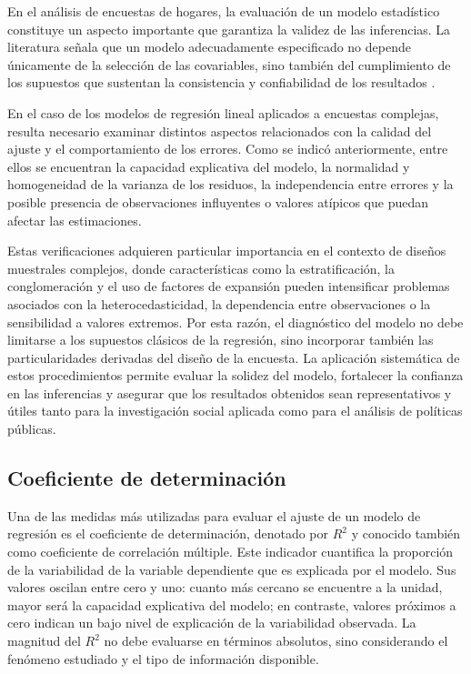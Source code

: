 \documentclass[
  spanish,
  12pt,
]{book}
\begin{document}
En el análisis de encuestas de hogares, la evaluación de un modelo estadístico constituye un aspecto importante que garantiza la validez de las inferencias. La literatura señala que un modelo adecuadamente especificado no depende únicamente de la selección de las covariables, sino también del cumplimiento de los supuestos que sustentan la consistencia y confiabilidad de los resultados \citep{tellez2015estadistica}.

En el caso de los modelos de regresión lineal aplicados a encuestas complejas, resulta necesario examinar distintos aspectos relacionados con la calidad del ajuste y el comportamiento de los errores. Como se indicó anteriormente, entre ellos se encuentran la capacidad explicativa del modelo, la normalidad y homogeneidad de la varianza de los residuos, la independencia entre errores y la posible presencia de observaciones influyentes o valores atípicos que puedan afectar las estimaciones.

Estas verificaciones adquieren particular importancia en el contexto de diseños muestrales complejos, donde características como la estratificación, la conglomeración y el uso de factores de expansión pueden intensificar problemas asociados con la heterocedasticidad, la dependencia entre observaciones o la sensibilidad a valores extremos. Por esta razón, el diagnóstico del modelo no debe limitarse a los supuestos clásicos de la regresión, sino incorporar también las particularidades derivadas del diseño de la encuesta. La aplicación sistemática de estos procedimientos permite evaluar la solidez del modelo, fortalecer la confianza en las inferencias y asegurar que los resultados obtenidos sean representativos y útiles tanto para la investigación social aplicada como para el análisis de políticas públicas.

\subsection{Coeficiente de determinación}\label{coeficiente-de-determinacion}

Una de las medidas más utilizadas para evaluar el ajuste de un modelo de regresión es el coeficiente de determinación, denotado por \(R^{2}\) y conocido también como coeficiente de correlación múltiple. Este indicador cuantifica la proporción de la variabilidad de la variable dependiente que es explicada por el modelo. Sus valores oscilan entre cero y uno: cuanto más cercano se encuentre a la unidad, mayor será la capacidad explicativa del modelo; en contraste, valores próximos a cero indican un bajo nivel de explicación de la variabilidad observada. La magnitud del \(R^{2}\) no debe evaluarse en términos absolutos, sino considerando el fenómeno estudiado y el tipo de información disponible.
\end{document}
